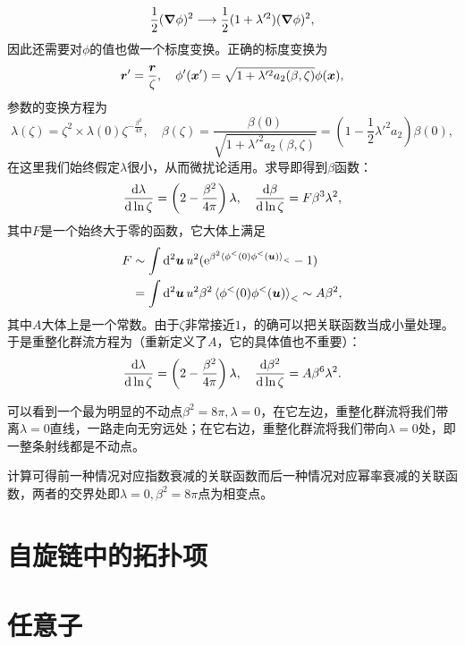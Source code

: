 \documentclass[hyperref, UTF8, a4paper]{ctexart}
\newcommand*{\ee}{\mathrm{e}}
\begin{document}
\[
    \frac{1}{2} (\grad{\phi})^2 \longrightarrow \frac{1}{2} (1 + \lambda'^2) (\grad{\phi})^2,
\]
因此还需要对$\phi$的值也做一个标度变换。正确的标度变换为
\[
    \vb*{r}' = \frac{\vb*{r}}{\zeta}, \quad \phi'(\vb*{x}') = \sqrt{1 + \lambda'^2 a_2(\beta, \zeta)} \phi(\vb*{x}),
\]
参数的变换方程为
\[
    \lambda(\zeta) = \zeta^2 \times \lambda(0) \zeta^{-\frac{\beta^2}{4\pi}}, \quad \beta(\zeta) = \frac{\beta(0)}{\sqrt{1 + \lambda'^2 a_2(\beta, \zeta)}} = (1 - \frac{1}{2} \lambda'^2 a_2) \beta(0),
\]
在这里我们始终假定$\lambda$很小，从而微扰论适用。求导即得到$\beta$函数：
\[
    \dv{\lambda}{\ln \zeta} = \left( 2 - \frac{\beta^2}{4\pi} \right) \lambda, \quad \dv{\beta}{\ln \zeta} = F \beta^3 \lambda^2,
\]
其中$F$是一个始终大于零的函数，它大体上满足
\[
    \begin{aligned}
        F &\sim \int \dd[2]{\vb*{u}} u^2 (\ee^{\beta^2 \expval*{\phi^<(0) \phi^<(\vb*{u})}_<} - 1) \\
        &= \int \dd[2]{\vb*{u}} u^2 \beta^2 \expval*{\phi^<(0) \phi^<(\vb*{u})}_< \sim A \beta^2,
    \end{aligned}
\]
其中$A$大体上是一个常数。由于$\zeta$非常接近$1$，的确可以把关联函数当成小量处理。
于是重整化群流方程为（重新定义了$A$，它的具体值也不重要）：
\begin{equation}
    \dv{\lambda}{\ln \zeta} = \left( 2 - \frac{\beta^2}{4\pi} \right) \lambda, \quad \dv{\beta^2}{\ln \zeta} = A \beta^6 \lambda^2.
\end{equation}


可以看到一个最为明显的不动点$\beta^2=8 \pi, \lambda=0$，在它左边，重整化群流将我们带离$\lambda=0$直线，一路走向无穷远处；在它右边，重整化群流将我们带向$\lambda=0$处，即一整条射线都是不动点。

计算可得前一种情况对应指数衰减的关联函数而后一种情况对应幂率衰减的关联函数，两者的交界处即$\lambda=0, \beta^2=8\pi$点为相变点。

\section{自旋链中的拓扑项}





\section{任意子}
\end{document}
